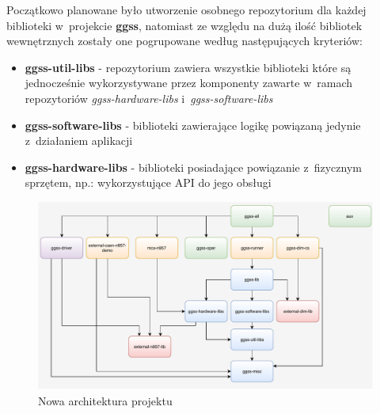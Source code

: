 Początkowo planowane było utworzenie osobnego repozytorium dla każdej biblioteki w~projekcie \textbf{ggss}, natomiast ze względu na dużą ilość bibliotek wewnętrznych zostały one pogrupowane według następujących kryteriów:
\begin{itemize}
\item \textbf{ggss-util-libs} - repozytorium zawiera wszystkie biblioteki które są jednocześnie wykorzystywane przez komponenty zawarte w~ramach repozytoriów \textit{ggss-hardware-libs} i~\textit{ggss-software-libs}
\item \textbf{ggss-software-libs} - biblioteki zawierające logikę powiązaną jedynie z~działaniem aplikacji
\item \textbf{ggss-hardware-libs} - biblioteki posiadające powiązanie z~fizycznym sprzętem, np.: wykorzystujące API do jego obsługi
\end{itemize}\par

\newpage

\begin{landscape}

\begin{figure}
\centering
\includegraphics[width=1.5\textwidth]{res/topLevelArchitecture}
\caption{Nowa architektura projektu}
\label{fig:topLevArch}
\end{figure}

\end{landscape}

